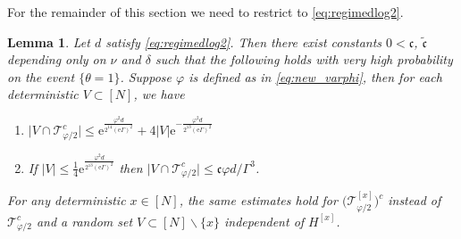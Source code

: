 \documentclass[11pt]{article}
\newcommand{\ee}{\mathrm{e}}
\newcommand{\abs}[1]{\left| #1 \right|}
\newcommand{\absn}[1]{\bigl| #1 \bigr|} %
\newcommand{\ccc}{\mathfrak{c}}
\theoremstyle{plain}
\newtheorem{lemma}{Lemma}[section]
\theoremstyle{remark}
\numberwithin{equation}{section}
\newcommand*\bset[1]{[#1]}
\begin{document}
For the remainder of this section we need to restrict to \cref{eq:regimedlog2}.
\begin{lemma}\label{lem:controlatypicalvertices}
 Let $d$ satisfy \cref{eq:regimedlog2}.
		Then there exist constants $0 < \ccc$, $\tilde{\ccc}$ depending only on $\nu$ and $\delta$  such that the following holds with very high probability on the event $\{\theta =1\}$. Suppose $\varphi$ is defined as in \cref{eq:new_varphi},
	 then for each deterministic $V \subset [N]$, 
		 we have 
		\begin{enumerate}[label=(\roman*)]
			\item \label{(i)}$ \absn{V\cap \mathcal{T}_{\varphi/2}^{c}} \le  \ee^{\frac{\varphi^2d}{2^{14} (\ee\Gamma)^2}}  + 4\abs{V} \ee^{-\frac{\varphi^2d}{2^{13} (\ee\Gamma)^2}} $
			\item \label{(ii)} If $\absn{V} \le \frac{1}{4} \ee^{\frac{\varphi^2 d }{2^{13} (\ee\Gamma)^2}} $ then $\absn{V \cap \mathcal{T}_{\varphi/2}^c} \le \ccc\varphi d/ \Gamma^3$. 
		
		\end{enumerate}
		For any deterministic $x \in [N]$, the same estimates hold for $\bigl(\mathcal{T}_{\varphi/2}^{\bset{x}}\bigr)^c$ instead of $\mathcal{T}_{\varphi/2}^{c}$ and a random set $V \subset [N] \backslash \{x\}$ independent of $H^{\bset{x}}$.
	\end{lemma}
	
\end{document}
